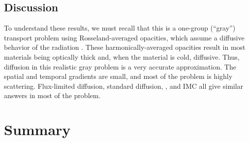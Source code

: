\subsection{Discussion}

To understand these results, we must recall that this is a one-group (``gray'')
transport problem using Rosseland-averaged opacities, which assume a diffusive
behavior of the radiation \cite{Pom1973,Lar1983a}. These harmonically-averaged
opacities result in most materials being optically thick and, when the material
is cold, diffusive. Thus, diffusion in this realistic gray problem is a very
accurate approximation. The spatial and temporal gradients are small, and most
of the problem is highly scattering. Flux-limited diffusion, standard diffusion,
\Pone, and IMC all give similar answers in most of the problem.

\section{Summary}

